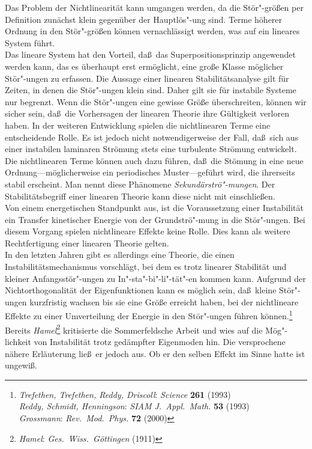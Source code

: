 \documentclass[10pt,a5paper,oneside,draft]{book}
\numberwithin{equation}{chapter}
\def\bibspace{\hspace*{18pt}}
\def\bibspace{\hspace*{21pt}}
\begin{document}
Das Problem der Nichtlinearit\"at kann umgangen werden, da die St\"or"-gr\"o\ss en per Definition zun\"achst klein gegen\"uber der Hauptl\"os"-ung sind.
Terme h\"oherer Ordnung in den St\"or"-gr\"o\ss en k\"onnen vernachl\"assigt werden, was auf ein lineares System f\"uhrt.\\
Das lineare System hat den Vorteil, da\ss\ das Superpositionsprinzip angewendet werden kann, das es \"uberhaupt erst erm\"oglicht, eine gro\ss e Klasse m\"oglicher St\"or"-ungen zu erfassen.
Die Aussage einer linearen Stabilit\"atsanalyse gilt f\"ur Zeiten, in denen die St\"or"-ungen klein sind.
Daher gilt sie f\"ur instabile Systeme nur begrenzt.
Wenn die St\"or"-ungen eine gewisse Gr\"o\ss e \"uberschreiten, k\"onnen wir sicher sein, da\ss\ die Vorhersagen der linearen Theorie ihre G\"ultigkeit verloren haben.
In der weiteren Entwicklung spielen die nichtlinearen Terme eine entscheidende Rolle.
Es ist jedoch nicht notwendigerweise der Fall, da\ss\ sich aus einer instabilen laminaren Str\"omung stets eine turbulente Str\"omung entwickelt.
Die nichtlinearen Terme k\"onnen auch dazu f\"uhren, da\ss\ die St\"omung in eine neue Ordnung---m\"oglicherweise ein periodisches Muster---gef\"uhrt wird, die ihrerseits stabil erscheint.
Man nennt diese Ph\"anomene \textit{Sekund\"arstr\"o"-mungen}.
Der Stabilit\"atsbegriff einer linearen Theorie kann diese nicht mit einschlie\ss en.\\

Von einem energetischen Standpunkt aus, ist die Voraussetzung einer Instabilit\"at ein Transfer kinetischer Energie von der Grundstr\"o"-mung in die St\"or"-ungen.
Bei diesem Vorgang spielen nichtlineare Effekte keine Rolle.
Dies kann als weitere Rechtfertigung einer linearen Theorie gelten.\\
In den letzten Jahren gibt es allerdings eine Theorie, die einen Instabilit\"atsmechanismus vorschl\"agt, bei dem es trotz linearer Stabilit\"at und kleiner Anfangsst\"or"-ungen zu In"-sta"-bi"-li"-t\"at"-en kommen kann.
Aufgrund der Nichtorthogonalit\"at der Eigenfunktionen kann es m\"oglich sein, da\ss\ kleine St\"or"-ungen kurzfristig wachsen bis sie eine Gr\"o\ss e erreicht haben, bei der nichtlineare Effekte zu einer Umverteilung der Energie in den St\"or"-ungen f\"uhren k\"onnen.\footnote{\label{bib:trefethen}\textsl{Trefethen, Trefethen, Reddy, Driscoll}: \textit{Science} \textbf{261} (1993)\\\bibspace\label{bib:reddy}\textsl{Reddy, Schmidt, Henningson}: \textit{SIAM J.\ Appl.\ Math.} \textbf{53} (1993)\\\bibspace\label{bib:grossmann}\textsl{Grossmann}: \textit{Rev.\ Mod.\ Phys.} \textbf{72} (2000)}\\
Bereits \textsl{Hamel}\footnote{\label{bib:hamel}\textsl{Hamel}: \textit{Ges.\ Wiss.\ G{\"o}ttingen} \textbf{} (1911)}
kritisierte die Sommerfeldsche Arbeit und wies auf die M\"og"-lichkeit von Instabilit\"at trotz ged\"ampfter Eigenmoden hin.
Die versprochene n\"ahere Erl\"auterung lie\ss\ er jedoch aus.
Ob er den selben Effekt im Sinne hatte ist ungewi\ss.\\
\end{document}
